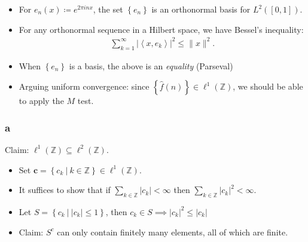 \begin{solution}

\hfill

\begin{concept}

\hfill

\begin{itemize}
\tightlist
\item
  For \(e_n(x) \coloneqq e^{2\pi i n x}\), the set
  \(\left\{{e_n}\right\}\) is an orthonormal basis for \(L^2([0, 1])\).
\item
  For any orthonormal sequence in a Hilbert space, we have Bessel's
  inequality:
  \begin{align*}
  \sum_{k=1}^{\infty}\left|\left\langle x, e_{k}\right\rangle\right|^{2} \leq\|x\|^{2}
  .\end{align*}
\item
  When \(\left\{{e_n}\right\}\) is a basis, the above is an
  \emph{equality} (Parseval)
\item
  Arguing uniform convergence: since
  \(\left\{{\widehat{f}(n)}\right\} \in \ell^1({\mathbb{Z}})\), we
  should be able to apply the \(M\) test.
\end{itemize}

\end{concept}

\hypertarget{a-12}{%
\subsubsection{a}\label{a-12}}

Claim: \(\ell^1({\mathbb{Z}}) \subseteq \ell^2({\mathbb{Z}})\).

\begin{itemize}
\tightlist
\item
  Set
  \(\mathbf{c} = \left\{{c_k {~\mathrel{\Big|}~}k\in {\mathbb{Z}}}\right\} \in \ell^1({\mathbb{Z}})\).
\item
  It suffices to show that if
  \(\sum_{k\in {\mathbb{Z}}} {\left\lvert {c_k} \right\rvert} < \infty\)
  then
  \(\sum_{k\in {\mathbb{Z}}} {\left\lvert {c_k} \right\rvert}^2 < \infty\).
\item
  Let
  \(S = \left\{{c_k {~\mathrel{\Big|}~}{\left\lvert {c_k} \right\rvert} \leq 1}\right\}\),
  then
  \(c_k \in S \implies {\left\lvert {c_k} \right\rvert}^2 \leq {\left\lvert {c_k} \right\rvert}\)
\item
  Claim: \(S^c\) can only contain finitely many elements, all of which
  are finite.


\end{itemize}
\end{solution}
